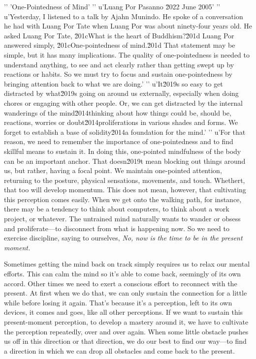'\n'
'One-Pointedness of Mind'
'\n'
u'Luang Por Pasanno \u2022 June 2005'
'\n'
u'Yesterday, I listened to a talk by Ajahn Munindo. He spoke of a conversation he had with Luang Por Tate when Luang Por was about ninety-four years old. He asked Luang Por Tate, \u201cWhat is the heart of Buddhism?\u201d Luang Por answered simply, \u201cOne-pointedness of mind.\u201d That statement may be simple, but it has many implications. The quality of one-pointedness is needed to understand anything, to see and act clearly rather than getting swept up by reactions or habits. So we must try to focus and sustain one-pointedness by bringing attention back to what we are doing.'
'\n'
u'It\u2019s so easy to get distracted by what\u2019s going on around us externally, especially when doing chores or engaging with other people. Or, we can get distracted by the internal wanderings of the mind\u2014thinking about how things could be, should be, reactions, worries or doubt\u2014proliferations in various shades and forms. We forget to establish a base of solidity\u2014a foundation for the mind.'
'\n'
u'For that reason, we need to remember the importance of one-pointedness and to find skillful means to sustain it. In doing this, one-pointed mindfulness of the body can be an important anchor. That doesn\u2019t mean blocking out things around us, but rather, having a focal point. We maintain one-pointed attention, returning to the posture, physical sensations, movements, and touch. Whethert, that too will develop momentum. This does not mean, 
however, that cultivating this perception comes easily. When we get 
onto the walking path, for instance, there may be a tendency to think 
about computers, to think about a work project, or whatever. The 
untrained mind naturally wants to wander or obsess and proliferate---to 
disconnect from what is happening now. So we need to exercise 
discipline, saying to ourselves, \emph{No, now is the time to be in the 
present moment.}

Sometimes getting the mind back on track simply requires us to relax 
our mental efforts. This can calm the mind so it's able to come back, 
seemingly of its own accord. Other times we need to exert a conscious 
effort to reconnect with the present. At first when we do that, we can 
only sustain the connection for a little while before losing it again. 
That's because it's a perception, left to its own devices, it comes and 
goes, like all other perceptions. If we want to sustain this 
present-moment perception, to develop a mastery around it, we have to 
cultivate the perception repeatedly, over and over again. When some 
little obstacle pushes us off in this direction or that direction, we 
do our best to find our way---to find a direction in which we can drop 
all obstacles and come back to the present.

